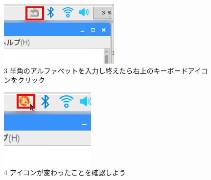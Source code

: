 \documentclass[a4paper,12pt]{jarticle}
\begin{document}
\begin{figure}[ht]
  \begin{minipage}{\textwidth}
    \begin{minipage}{0.45\textwidth}
      \includegraphics[width=0.75\linewidth]{textbook-img059.png}\\
      3 半角のアルファベットを入力し終えたら右上のキーボードアイコンをクリック
    \end{minipage}
    \begin{minipage}{2.582cm}
    \end{minipage}
    \begin{minipage}{0.45\textwidth}
      \includegraphics[width=0.75\linewidth]{textbook-img062.png}\\
      4 アイコンが変わったことを確認しよう
    \end{minipage}
  \end{minipage}


\end{figure}
\end{document}
